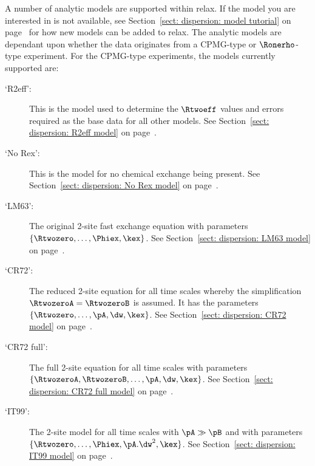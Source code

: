 A number of analytic models are supported within relax.
If the model you are interested in is not available, see Section~\ref{sect: dispersion: model tutorial} on page~\pageref{sect: dispersion: model tutorial} for how new models can be added to relax.
The analytic models are dependant upon whether the data originates from a CPMG-type or $\Ronerho$-type experiment.
For the CPMG-type experiments, the models currently supported are:

\begin{description}
\item[`R2eff':]  This is the model used to determine the $\Rtwoeff$ values and errors required as the base data for all other models.  See Section~\ref{sect: dispersion: R2eff model} on page~\pageref{sect: dispersion: R2eff model}.
\item[`No Rex':]  This is the model for no chemical exchange being present.  See Section~\ref{sect: dispersion: No Rex model} on page~\pageref{sect: dispersion: No Rex model}.
\item[`LM63':]  The original \citet{LuzMeiboom63} 2-site fast exchange equation with parameters $\{\Rtwozero, \dots, \Phiex, \kex\}$.  See Section~\ref{sect: dispersion: LM63 model} on page~\pageref{sect: dispersion: LM63 model}.
\item[`CR72':]  The reduced \citet{CarverRichards72} 2-site equation for all time scales whereby the simplification $\RtwozeroA = \RtwozeroB$ is assumed.  It has the parameters $\{\Rtwozero, \dots, \pA, \dw, \kex\}$.  See Section~\ref{sect: dispersion: CR72 model} on page~\pageref{sect: dispersion: CR72 model}.
\item[`CR72 full':]  The full \citet{CarverRichards72} 2-site equation for all time scales with parameters $\{\RtwozeroA, \RtwozeroB, \dots, \pA, \dw, \kex\}$.  See Section~\ref{sect: dispersion: CR72 full model} on page~\pageref{sect: dispersion: CR72 full model}.
\item[`IT99':]  The \citet{IshimaTorchia99} 2-site model for all time scales with $\pA \gg \pB$ and with parameters $\{\Rtwozero, \dots, \Phiex, \pA.\dw^2, \kex\}$.  See Section~\ref{sect: dispersion: IT99 model} on page~\pageref{sect: dispersion: IT99 model}.
\end{description}

